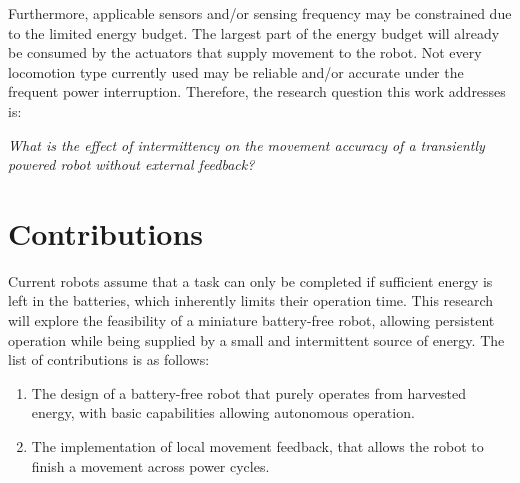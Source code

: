 Furthermore, applicable sensors and/or sensing frequency may be constrained due to the limited energy budget.
The largest part of the energy budget will already be consumed by the actuators that supply movement to the robot.
Not every locomotion type currently used may be reliable and/or accurate under the frequent power interruption.
Therefore, the research question this work addresses is:

\begin{center}
	\textit{What is the effect of intermittency on the movement accuracy of a transiently powered robot without external feedback?}
\end{center}

\section{Contributions}
Current robots assume that a task can only be completed if sufficient energy is left in the batteries, which inherently limits their operation time. 
This research will explore the feasibility of a miniature battery-free robot, allowing persistent operation while being supplied by a small and intermittent source of energy.
The list of contributions is as follows:

\begin{enumerate}


\item The design of a battery-free robot that purely operates from harvested energy, with basic capabilities allowing autonomous operation.

\item The implementation of local movement feedback, that allows the robot to finish a movement across power cycles.


\end{enumerate}


